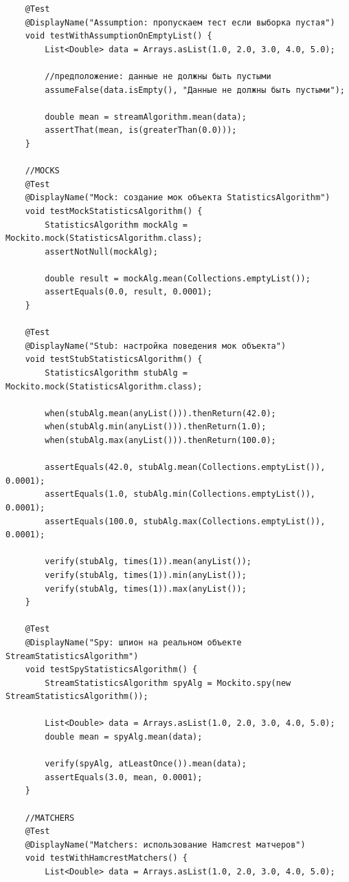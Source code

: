 \begin{verbatim}
    @Test
    @DisplayName("Assumption: пропускаем тест если выборка пустая")
    void testWithAssumptionOnEmptyList() {
        List<Double> data = Arrays.asList(1.0, 2.0, 3.0, 4.0, 5.0);

        //предположение: данные не должны быть пустыми
        assumeFalse(data.isEmpty(), "Данные не должны быть пустыми");

        double mean = streamAlgorithm.mean(data);
        assertThat(mean, is(greaterThan(0.0)));
    }

    //MOCKS
    @Test
    @DisplayName("Mock: создание мок объекта StatisticsAlgorithm")
    void testMockStatisticsAlgorithm() {
        StatisticsAlgorithm mockAlg = Mockito.mock(StatisticsAlgorithm.class);
        assertNotNull(mockAlg);

        double result = mockAlg.mean(Collections.emptyList());
        assertEquals(0.0, result, 0.0001);
    }

    @Test
    @DisplayName("Stub: настройка поведения мок объекта")
    void testStubStatisticsAlgorithm() {
        StatisticsAlgorithm stubAlg = Mockito.mock(StatisticsAlgorithm.class);

        when(stubAlg.mean(anyList())).thenReturn(42.0);
        when(stubAlg.min(anyList())).thenReturn(1.0);
        when(stubAlg.max(anyList())).thenReturn(100.0);

        assertEquals(42.0, stubAlg.mean(Collections.emptyList()), 0.0001);
        assertEquals(1.0, stubAlg.min(Collections.emptyList()), 0.0001);
        assertEquals(100.0, stubAlg.max(Collections.emptyList()), 0.0001);

        verify(stubAlg, times(1)).mean(anyList());
        verify(stubAlg, times(1)).min(anyList());
        verify(stubAlg, times(1)).max(anyList());
    }

    @Test
    @DisplayName("Spy: шпион на реальном объекте StreamStatisticsAlgorithm")
    void testSpyStatisticsAlgorithm() {
        StreamStatisticsAlgorithm spyAlg = Mockito.spy(new StreamStatisticsAlgorithm());

        List<Double> data = Arrays.asList(1.0, 2.0, 3.0, 4.0, 5.0);
        double mean = spyAlg.mean(data);

        verify(spyAlg, atLeastOnce()).mean(data);
        assertEquals(3.0, mean, 0.0001);
    }

    //MATCHERS
    @Test
    @DisplayName("Matchers: использование Hamcrest матчеров")
    void testWithHamcrestMatchers() {
        List<Double> data = Arrays.asList(1.0, 2.0, 3.0, 4.0, 5.0);


\end{verbatim}
